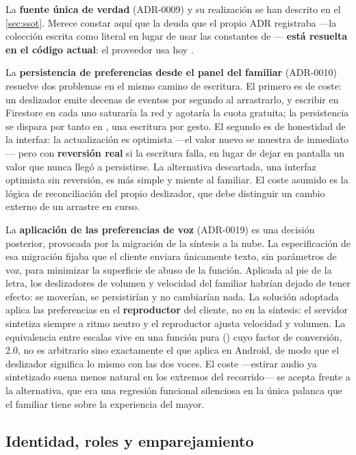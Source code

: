 La \textbf{fuente única de verdad} (ADR-0009) y su realización se han descrito en el \autoref{sec:ssot}.
Merece constar aquí que la deuda que el propio ADR registraba ---la colección  escrita como
literal en lugar de usar las constantes de --- \textbf{está resuelta en el código
actual}: el proveedor usa hoy .

La \textbf{persistencia de preferencias desde el panel del familiar} (ADR-0010) resuelve dos problemas en el
mismo camino de escritura. El primero es de coste: un deslizador emite decenas de eventos por segundo al
arrastrarlo, y escribir en Firestore en cada uno saturaría la red y agotaría la cuota gratuita; la
persistencia se dispara por tanto en , una escritura por gesto. El segundo es de
honestidad de la interfaz: la actualización es optimista ---el valor nuevo se muestra de inmediato--- pero
con \textbf{reversión real} si la escritura falla, en lugar de dejar en pantalla un valor que nunca llegó a
persistirse. La alternativa descartada, una interfaz optimista sin reversión, es más simple y miente al
familiar. El coste asumido es la lógica de reconciliación del propio deslizador, que debe distinguir un
cambio externo de un arrastre en curso.

La \textbf{aplicación de las preferencias de voz} (ADR-0019) es una decisión posterior, provocada por la
migración de la síntesis a la nube. La especificación de esa migración fijaba que el cliente enviara
únicamente texto, sin parámetros de voz, para minimizar la superficie de abuso de la función. Aplicada al
pie de la letra, los deslizadores de volumen y velocidad del familiar habrían dejado de tener efecto: se
moverían, se persistirían y no cambiarían nada. La solución adoptada aplica las preferencias en el
\textbf{reproductor} del cliente, no en la síntesis: el servidor sintetiza siempre a ritmo neutro y el
reproductor ajusta velocidad y volumen. La equivalencia entre escalas vive en una función pura
() cuyo factor de conversión, 2.0, no es arbitrario sino exactamente el que
 aplica en Android, de modo que el deslizador significa lo mismo con las dos voces. El
coste ---estirar audio ya sintetizado suena menos natural en los extremos del recorrido--- se acepta frente
a la alternativa, que era una regresión funcional silenciosa en la única palanca que el familiar tiene
sobre la experiencia del mayor.

\subsection{Identidad, roles y emparejamiento}
\label{sec:adr-identidad}

